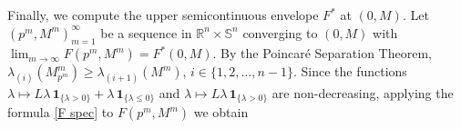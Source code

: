 \documentclass[11pt]{amsart}
\numberwithin{equation}{section}
\begin{document}
Finally, we compute the upper semicontinuous envelope $F^*$ at $(0,M)$.
%
%
Let $(p^m,M^m)_{m=1}^\infty$ be a sequence in ${\mathbb R}^n\times\mathbb{S}^n$ converging to $(0,M)$ with $\lim_{m\to\infty} F(p^m,M^m)=F^*(0,M)$. By the Poincar\'{e} Separation Theorem, $\lambda_{(i)}(M^m_{p^m})\ge\lambda_{(i+1)}(M^m)$, $i\in\{1,2,\ldots,n-1\}$. Since the functions $\lambda\mapsto L\lambda\,\mathbf{1}_{\{\lambda>0\}}+\lambda\,\mathbf{1}_{\{\lambda\le0\}}$ and $\lambda\mapsto L\lambda\,\mathbf{1}_{\{\lambda>0\}}$ are non-decreasing, applying the formula \eqref{F spec} to $F(p^m,M^m)$ we obtain
\end{document}
